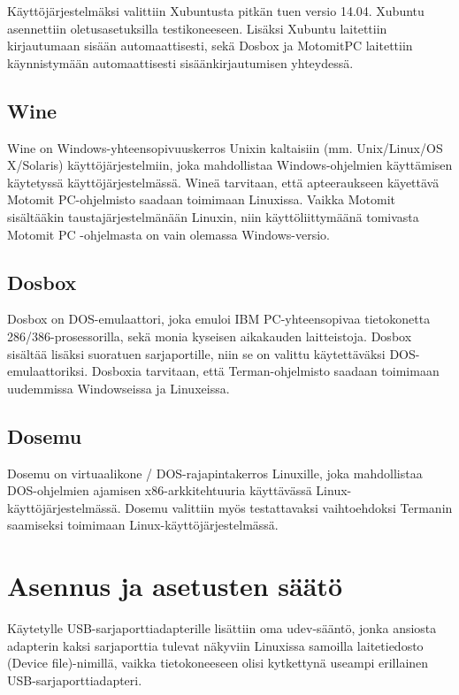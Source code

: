 \documentclass[11pt,a4paper,oneside,article]{memoir}
\begin{document}
Käyttöjärjestelmäksi valittiin Xubuntusta pitkän tuen versio 14.04.
Xubuntu asennettiin oletusasetuksilla testikoneeseen. Lisäksi Xubuntu
laitettiin kirjautumaan sisään automaattisesti, sekä Dosbox ja MotomitPC
laitettiin käynnistymään automaattisesti sisäänkirjautumisen yhteydessä.


\subsection{Wine}

Wine on Windows-yhteensopivuuskerros Unixin kaltaisiin (mm. Unix/Linux/OS X/Solaris) käyttöjärjestelmiin, joka mahdollistaa Windows-ohjelmien käyttämisen käytetyssä käyttöjärjestelmässä. Wineä tarvitaan, että apteeraukseen käyettävä Motomit PC-ohjelmisto saadaan toimimaan Linuxissa. Vaikka Motomit sisältääkin taustajärjestelmänään Linuxin\cite{motomit:manual}, niin käyttöliittymäänä tomivasta Motomit PC -ohjelmasta on vain olemassa Windows-versio.

\subsection{Dosbox}

Dosbox on DOS-emulaattori, joka emuloi IBM PC-yhteensopivaa tietokonetta 286/386-prosessorilla, sekä monia kyseisen aikakauden laitteistoja. Dosbox sisältää lisäksi suoratuen sarjaportille, niin se on valittu käytettäväksi DOS-emulaattoriksi. Dosboxia tarvitaan, että Terman-ohjelmisto saadaan toimimaan uudemmissa Windowseissa ja Linuxeissa.

\subsection{Dosemu}
Dosemu on virtuaalikone / DOS-rajapintakerros Linuxille, joka mahdollistaa DOS-ohjelmien ajamisen x86-arkkitehtuuria käyttävässä Linux-käyttöjärjestelmässä. Dosemu valittiin myös testattavaksi vaihtoehdoksi Termanin saamiseksi toimimaan Linux-käyttöjärjestelmässä.

\section{Asennus ja asetusten säätö}
Käytetylle USB-sarjaporttiadapterille lisättiin oma udev-sääntö, jonka ansiosta adapterin kaksi sarjaporttia tulevat näkyviin Linuxissa samoilla laitetiedosto (Device file)-nimillä, vaikka tietokoneeseen olisi kytkettynä useampi erillainen USB-sarjaporttiadapteri.
\end{document}
